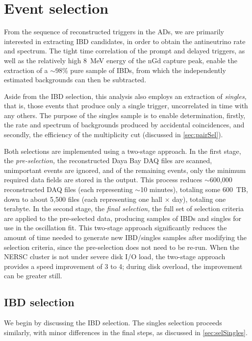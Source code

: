 \documentclass[../thesis.tex]{subfiles}
\begin{document}
\chapter{Event selection}
\label{chap:selection}

From the sequence of reconstructed triggers in the ADs, we are primarily
interested in extracting IBD candidates, in order to obtain the antineutrino
rate and spectrum. The tight time correlation of the prompt and delayed
triggers, as well as the relatively high 8~MeV energy of the nGd capture peak,
enable the extraction of a $\sim$98\% pure sample of IBDs, from which the
independently estimated backgrounds can then be subtracted.

Aside from the IBD selection, this analysis also employs an extraction of
\emph{singles,} that is, those events that produce only a single trigger,
uncorrelated in time with any others. The purpose of the singles sample is to
enable determination, firstly, the rate and spectrum of backgrounds produced by
accidental coincidences, and secondly, the efficiency of the multiplicity cut
(discussed in \autoref{sec:pairSel}).

Both selections are implemented using a two-stage approach. In the first stage,
the \emph{pre-selection,} the reconstructed Daya Bay DAQ files are scanned,
unimportant events are ignored, and of the remaining events, only the minimum
required data fields are stored in the output. This process reduces
$\sim$600,000 reconstructed DAQ files (each representing $\sim$10 minutes),
totaling some 600~TB, down to about 5,500 files (each representing one hall
$\times$ day), totaling one terabyte. In the second stage, the \emph{final
  selection,} the full set of selection criteria are applied to the pre-selected
data, producing samples of IBDs and singles for use in the oscillation fit. This
two-stage approach significantly reduces the amount of time needed to generate
new IBD/singles samples after modifying the selection criteria, since the
pre-selection does not need to be re-run. When the NERSC cluster is not under
severe disk I/O load, the two-stage approach provides a speed improvement of 3
to 4; during disk overload, the improvement can be greater still.

\section{IBD selection}
\label{sec:selIBDs}

We begin by discussing the IBD selection. The singles selection proceeds
similarly, with minor differences in the final steps, as discussed in
\autoref{sec:selSingles}.
\end{document}
